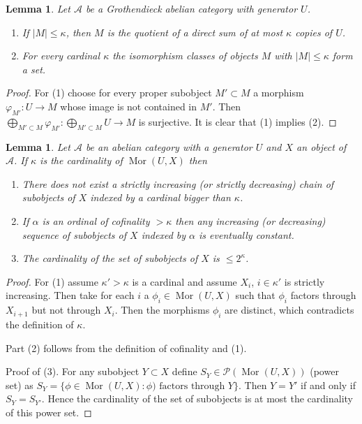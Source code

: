 \documentclass{amsart}
\theoremstyle{plain}
\newtheorem{lemma}[subsection]{Lemma}
\theoremstyle{definition}
\theoremstyle{remark}
\numberwithin{equation}{subsection}
\def\Mor{\mathop{\mathrm{Mor}}\nolimits}
\begin{document}
\begin{lemma}
\label{lemma-set-iso-classes-bounded-size}
Let $\mathcal{A}$ be a Grothendieck abelian category with generator $U$.
\begin{enumerate}
\item If $|M| \leq \kappa$, then $M$ is the quotient of a direct
sum of at most $\kappa$ copies of $U$.
\item For every cardinal $\kappa$ the isomorphism classes
of objects $M$ with $|M| \leq \kappa$ form a set.
\end{enumerate}
\end{lemma}

\begin{proof}
For (1) choose for every proper subobject $M' \subset M$ a morphism
$\varphi_{M'} : U \to M$ whose image is not contained in $M'$. Then
$\bigoplus_{M' \subset M} \varphi_{M'} : \bigoplus_{M' \subset M} U \to M$
is surjective. It is clear that (1) implies (2).
\end{proof}


\begin{lemma}
\label{lemma-set-of-subobjects}
Let $\mathcal{A}$ be an abelian category with a generator $U$ and
$X$ an object of $\mathcal{A}$. If $\kappa$ is the cardinality of
$\Mor(U, X)$ then
\begin{enumerate}
\item There does not exist a strictly increasing
(or strictly decreasing) chain of subobjects
of $X$ indexed by a cardinal bigger than $\kappa$.
\item If $\alpha$ is an ordinal of cofinality $> \kappa$
then any increasing (or decreasing) sequence of subobjects
of $X$ indexed by $\alpha$ is eventually constant.
\item The cardinality of the set of subobjects of $X$
is $\leq 2^\kappa$.
\end{enumerate}
\end{lemma}

\begin{proof}
For (1) assume $\kappa' > \kappa$ is a cardinal and assume
$X_i$, $i \in \kappa'$ is strictly increasing. Then take for
each $i$ a $\phi_i \in \Mor(U, X)$ such that $\phi_i$ factors through
$X_{i + 1}$ but not through $X_i$. Then the morphisms $\phi_i$
are distinct, which contradicts the definition of $\kappa$.

\medskip\noindent
Part (2) follows from the definition of cofinality and (1).

\medskip\noindent
Proof of (3). For any subobject $Y \subset X$
define $S_Y \in \mathcal{P}(\Mor(U, X))$ (power set) as
$S_Y = \{\phi \in \Mor(U,X) : \phi)\text{ factors through }Y\}$.
Then $Y = Y'$ if and only if $S_Y = S_{Y'}$. Hence the cardinality
of the set of subobjects is at most the cardinality of this power set.
\end{proof}
\end{document}
